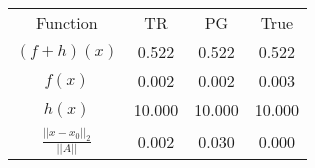 \begin{tabular}{| c |c |c |c |}
    \hline
    \rowcolor[gray]{0.9}
\multicolumn{4}{|c|}{Minima} \\ \hline Function & TR & PG & True \\
    \hline
  \rowcolor[gray]{0.7}
    $ (f + h)(x) $ & 0.522 & 0.522 & 0.522 \\
  \hline
  \rowcolor[gray]{0.8}
    $ f(x) $ & 0.002 & 0.002 & 0.003 \\
  \hline
  \rowcolor[gray]{0.7}
    $ h(x) $ & 10.000 & 10.000 & 10.000 \\
  \hline
  \rowcolor[gray]{0.8}
    $ \frac{||x - x_0||_2}{||A||} $ & 0.002 & 0.030 & 0.000 \\
  \hline
\end{tabular}
